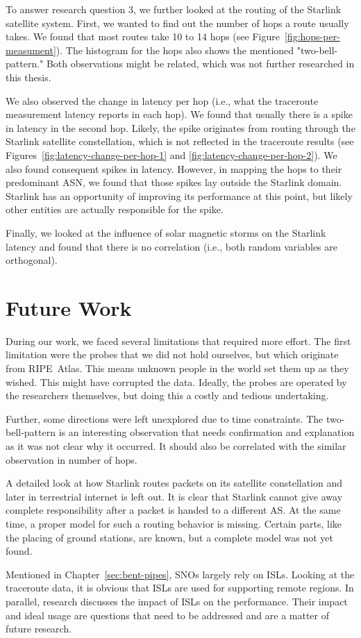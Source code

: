 To answer research question 3, we further looked at the routing of the Starlink
satellite system. First, we wanted to find out the number of hops a route
usually takes. We found that most routes take 10 to 14 hops (see
Figure~\ref{fig:hops-per-measument}). The histogram for the hops also shows the
mentioned "two-bell-pattern." Both observations might be related, which was not
further researched in this thesis.

We also observed the change in latency per hop (i.e., what the traceroute
measurement latency reports in each hop). We found that usually there is a
spike in latency in the second hop. Likely, the spike originates from routing
through the Starlink satellite constellation, which is not reflected in the
traceroute results (see Figures~\ref{fig:latency-change-per-hop-1} and
\ref{fig:latency-change-per-hop-2}). We also found consequent spikes in
latency. However, in mapping the hops to their predominant ASN, we found that
those spikes lay outside the Starlink domain. Starlink has an opportunity of
improving its performance at this point, but likely other entities are actually
responsible for the spike.

Finally, we looked at the influence of solar magnetic storms on the Starlink
latency and found that there is no correlation (i.e., both random
variables are orthogonal).

\section{Future Work}

During our work, we faced several limitations that required more effort. The
first limitation were the probes that we did not hold ourselves, but which
originate from RIPE~Atlas. This means unknown people in the world set them up
as they wished. This might have corrupted the data. Ideally, the probes are
operated by the researchers themselves, but doing this a costly and tedious
undertaking.

Further, some directions were left unexplored due to time constraints. The
two-bell-pattern is an interesting observation that needs confirmation and
explanation as it was not clear why it occurred. It should also be correlated
with the similar observation in number of hops.

A detailed look at how Starlink routes packets on its satellite constellation
and later in terrestrial internet is left out. It is clear that Starlink cannot
give away complete responsibility after a packet is handed to a different AS.
At the same time, a proper model for such a routing behavior is missing.
Certain parts, like the placing of ground stations, are known, but a complete
model was not yet found.

Mentioned in Chapter~\ref{sec:bent-pipes}, \ac{SNO}s largely rely on \ac{ISL}s.
Looking at the traceroute data, it is obvious that \ac{ISL}s are used for
supporting remote regions. In parallel, research discusses the impact of
\ac{ISL}s on the performance. Their impact and ideal usage are questions that
need to be addressed and are a matter of future research.
